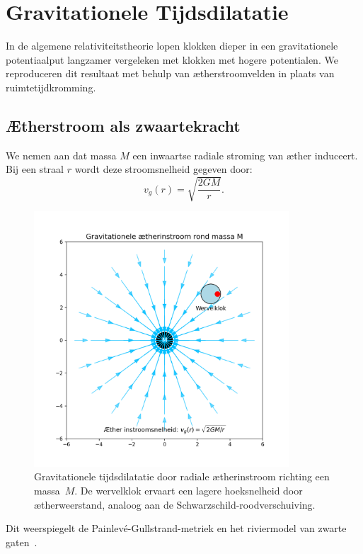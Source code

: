 \section{Gravitationele Tijdsdilatatie}

In de algemene relativiteitstheorie lopen klokken dieper in een gravitationele potentiaalput langzamer vergeleken met klokken met hogere potentialen. We reproduceren dit resultaat met behulp van ætherstroomvelden in plaats van ruimtetijdkromming.

\subsection*{Ætherstroom als zwaartekracht}

We nemen aan dat massa $M$ een inwaartse radiale stroming van æther induceert. Bij een straal $r$ wordt deze stroomsnelheid gegeven door:
\[
    v_g(r) = \sqrt{\frac{2GM}{r}}.
\]


\begin{figure}[htbp]
    \centering
    \includegraphics[width=0.85\textwidth]{4-GravitationeleÆtherinstroom}
    \caption{Gravitationele tijdsdilatatie door radiale ætherinstroom richting een massa~$M$. De wervelklok ervaart een lagere hoeksnelheid door ætherweerstand, analoog aan de Schwarzschild-roodverschuiving.}
    \label{fig:GravitationeleÆtherinstroom}
\end{figure}

Dit weerspiegelt de Painlevé-Gullstrand-metriek en het riviermodel van zwarte gaten~\cite{Hamilton2004-river}.

